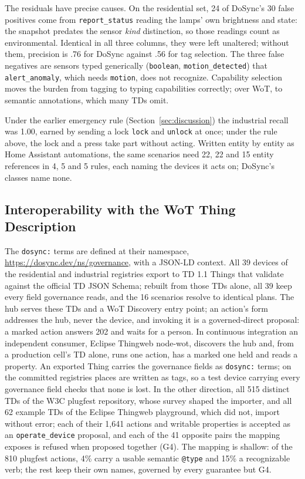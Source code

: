 \documentclass[conference]{IEEEtran}
\newcommand{\code}[1]{\texttt{#1}}
\begin{document}
The residuals have precise causes. On the residential set, 24 of DoSync's 30 false positives come from \code{report\_status} reading the lamps' own brightness and state: the snapshot predates the sensor \emph{kind} distinction, so those readings count as environmental. Identical in all three columns, they were left unaltered; without them, precision is .76 for DoSync against .56 for tag selection. The three false negatives are sensors typed generically (\code{boolean}, \code{motion\_detected}) that \code{alert\_anomaly}, which needs \code{motion}, does not recognize. Capability selection moves the burden from tagging to typing capabilities correctly; over WoT, to semantic annotations, which many TDs omit.

Under the earlier emergency rule (Section~\ref{sec:discussion}) the industrial recall was 1.00, earned by sending a lock \code{lock} and \code{unlock} at once; under the rule above, the lock and a press take part without acting. Written entity by entity as Home Assistant automations, the same scenarios need 22, 22 and 15 entity references in 4, 5 and 5 rules, each naming the devices it acts on; DoSync's classes name none.

\subsection{Interoperability with the WoT Thing Description}
The \code{dosync:} terms are defined at their namespace, \url{https://dosync.dev/ns/governance}, with a JSON-LD context. All 39 devices of the residential and industrial registries export to TD 1.1 Things that validate against the official TD JSON Schema; rebuilt from those TDs alone, all 39 keep every field governance reads, and the 16 scenarios resolve to identical plans. The hub serves these TDs and a WoT Discovery entry point; an action's form addresses the hub, never the device, and invoking it is a governed-direct proposal: a marked action answers 202 and waits for a person. In continuous integration an independent consumer, Eclipse Thingweb node-wot, discovers the hub and, from a production cell's TD alone, runs one action, has a marked one held and reads a property. An exported Thing carries the governance fields as \code{dosync:} terms; on the committed registries places are written as tags, so a test device carrying every governance field checks that none is lost. In the other direction, all 515 distinct TDs of the W3C plugfest repository, whose survey shaped the importer, and all 62 example TDs of the Eclipse Thingweb playground, which did not, import without error; each of their 1{,}641 actions and writable properties is accepted as an \code{operate\_device} proposal, and each of the 41 opposite pairs the mapping exposes is refused when proposed together (G4). The mapping is shallow: of the 810 plugfest actions, 4\% carry a usable semantic \code{@type} and 15\% a recognizable verb; the rest keep their own names, governed by every guarantee but G4.
\end{document}
